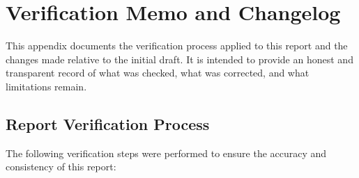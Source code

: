 \chapter{Verification Memo and Changelog}
\label{app:changelog}

This appendix documents the verification process applied to this report and the changes made relative to the initial draft. It is intended to provide an honest and transparent record of what was checked, what was corrected, and what limitations remain.

\section{Report Verification Process}

The following verification steps were performed to ensure the accuracy and consistency of this report:

